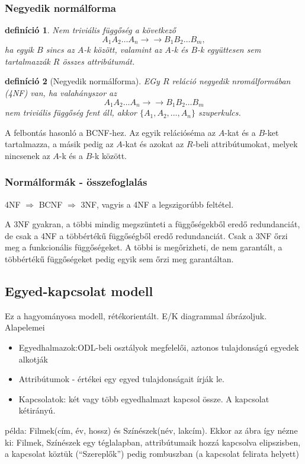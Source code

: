 \documentclass[fleqn,10pt,a4paper]{article}
\newcommand{\nn}{\Rightarrow}
\theoremstyle{magyar}
\newtheorem{de}{definíció}[section]
\begin{document}
  \subsubsection{Negyedik normálforma}
  \begin{de}Nem triviális függőség a következő
    \[A_1 A_2\ldots A_n\to\to B_1 B_2\ldots B_m,\]
    ha egyik $B$ sincs az $A$-k között, valamint az $A$-k és $B$-k együttesen sem tartalmazzák $R$ összes attribútumát.
  \end{de}
  \begin{de}[Negyedik normálforma] EGy $R$ reláció negyedik nromálformában (4NF) van, ha valahányszor az
    \[ A_1 A_2\ldots A_n\to\to B_1 B_2\ldots B_m\]
    nem triviális függőség fent áll, akkor $\{ A_1, A_2,\dotsc,A_n\}$ szuperkulcs.    
  \end{de}

  A felbontás hasonló a BCNF-hez. Az egyik relációséma az $A$-kat és a $B$-ket tartalmazza, a másik pedig az $A$-kat és
  azokat az $R$-beli attribútumokat, melyek nincsenek az $A$-k és a $B$-k között.

  \subsubsection{Normálformák - összefoglalás}
  4NF $\nn$ BCNF $\nn$ 3NF, vagyis a 4NF a legszigorúbb feltétel.
  
  A 3NF gyakran, a többi mindig megszünteti  a függőségekből eredő redundanciát, de csak a 4NF a többértékű függőségből
  eredő redundanciát. Csak a 3NF őrzi meg a funkcionális függőségeket. A többi is megőrizheti, de nem garantált, a
  többértékű függőségeket pedig egyik sem őrzi meg garantáltan.
  
  \subsection{Egyed-kapcsolat modell}
  Ez a hagyományosa modell, rétékorientált. E/K diagrammal ábrázoljuk. Alapelemei
  \begin{itemize}
  \item Egyedhalmazok:ODL-beli osztályok megfelelői, aztonos tulajdonságú egyedek alkotják
  \item Attribútumok - értékei egy egyed tulajdonságait írják le.
  \item Kapcsolatok: két vagy több egyedhalmazt kapcsol össze. A kapcsolat kétirányú.
  \end{itemize}
  
  példa:
  Filmek(cím, év, hossz) és Színészek(név, lakcím). Ekkor az ábra így nézne ki: Filmek, Színészek egy téglalapban,
  attribútumaik hozzá kapcsolva elipszisben, a kapcsolat köztük (``Szereplők'') pedig rombuszban (a kapcsolat felirata
  helyett)
  
\end{document}
